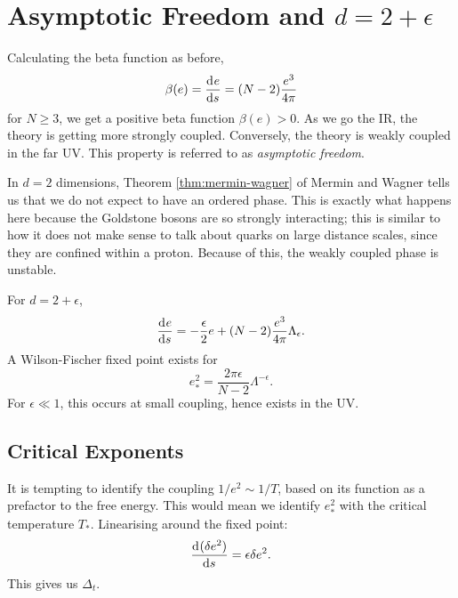 
\section{Asymptotic Freedom and \texorpdfstring{$d=2+\epsilon$}{dimension two plus epsilon}}%
\label{sec:asymptotic_freedom_and_dimension_two_plus_epsilon}

Calculating the beta function as before,
\begin{equation}
  \beta(e) = \dv[]{e}{s} = (N-2) \frac{e^3}{4 \pi}
\end{equation}
for $N \geq 3$, we get a positive beta function $\beta(e) > 0$.
As we go the IR, the theory is getting more strongly coupled. Conversely, the theory is weakly coupled in the far UV.
This property is referred to as \emph{asymptotic freedom}.

In $d  =2$ dimensions, Theorem \ref{thm:mermin-wagner} of Mermin and Wagner tells us that we do not expect to have an ordered phase. This is exactly what happens here because the Goldstone bosons are so strongly interacting; this is similar to how it does not make sense to talk about quarks on large distance scales, since they are confined within a proton.
Because of this, the weakly coupled phase is unstable.

For $d = 2 + \epsilon$, 
\begin{equation}
  \dv[]{e}{s} = - \frac{\epsilon}{2} e + (N-2) \frac{e^3}{4 \pi} \Lambda_{\epsilon}.
\end{equation}
A Wilson-Fischer fixed point exists for 
\begin{equation}
  e^2_* = \frac{2\pi \epsilon}{N - 2} \Lambda^{-\epsilon}.
\end{equation}
For $\epsilon \ll 1$, this occurs at small coupling, hence exists in the UV.

\subsection{Critical Exponents}%
\label{sub:critical_exponents}

It is tempting to identify the coupling $1 / e^2 \sim 1 / T$, based on its function as a prefactor to the free energy.
This would mean we identify $e^2_*$ with the critical temperature $T_*$.
Linearising around the fixed point:
\begin{equation}
  \dv[]{(\delta e^2)}{s} = \epsilon \delta e^2.
\end{equation}
This gives us $\Delta_t$.


